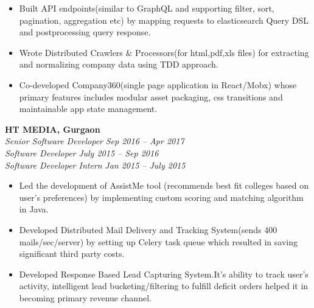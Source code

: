 \documentclass[margin,line]{resume}
\begin{document}
\begin{resume}
\begin{itemize}
            \item Built API endpoints(similar to GraphQL and supporting filter, sort, pagination, aggregation etc) by mapping requests to elasticsearch Query DSL and postprocessing query response.
            \item Wrote Distributed Crawlers \& Processors(for html,pdf,xls files) for extracting and normalizing company data using TDD approach.
           \item Co-developed Company360(single page application in React/Mobx) whose primary features includes modular asset packaging, css transitions and maintainable app state management.
        \end{itemize}

    \newpage

    \textbf{HT MEDIA, Gurgaon}\\
           \textsl{Senior Software Developer} \hfill \textsl{Sep 2016 -- Apr 2017} \vspace{0mm}\\\vspace{0mm}%
           \textsl{Software Developer} \hfill \textsl{July 2015 -- Sep 2016} \vspace{0mm}\\\vspace{0mm}%
           \textsl{Software Developer Intern} \hfill \textsl{Jan 2015 -- July 2015} \vspace{1mm}%
    \begin{itemize}
            \item Led the development of AssistMe tool (recommends best fit colleges based on user's preferences) by implementing custom scoring and matching algorithm in Java.
            \item Developed Distributed Mail Delivery and Tracking System(sends 400 mails/sec/server) by setting up Celery task queue which resulted in saving significant third party costs.
            \item Developed Response Based Lead Capturing System.It's ability to track user's activity, intelligent lead bucketing/filtering to fulfill deficit orders helped it in becoming primary revenue channel.


\end{itemize}
\end{resume}
\end{document}
